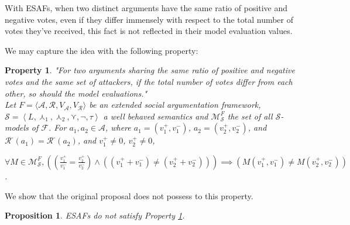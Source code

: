 \documentclass{article}
\newtheorem{property}{Property}
\newtheorem{proposition}{Proposition}
\newcommand{\args}{\mathcal{A}} %
\newcommand{\att}{\mathcal{R}}  %
\newcommand{\valueset}{L}
\newcommand{\varg}{V_{\args}}   %
\newcommand{\vatt}{V_{\att}}   %
\newcommand{\attackers}[1]{\att^\text{-}\left(#1\right)}
\newcommand{\safid}{F}               %
\newcommand{\saf}{\safid = \safbody} %
\newcommand{\safbody}{\langle \args, \att, \varg, \vatt \rangle} %
\newcommand{\semid}{\mathcal{S}}        %
\newcommand{\sembody}{\left\langle \valueset,\SAFand_1, \SAFand_2,\SAFor,\lnot,\tau \right\rangle}
\newcommand{\semdef}{\semid = \sembody}     %
\newcommand{\SAFand}{\curlywedge}     %
\newcommand{\SAFor}{\curlyvee}        %
\begin{document}
With ESAFs, when two distinct arguments have the same ratio of positive and negative votes, even if they differ immensely with respect to the total number of votes they've received, this fact is not reflected in their model evaluation values. 

We may capture the idea with the following property:

\begin{property}
\label{pro:dim}
"For two arguments sharing the same ratio of positive and negative votes and the same set of attackers, if the total number of votes differ from each other, so should the model evaluations."\\
Let $\saf$ be an extended social argumentation framework, $\semdef$ a well behaved semantics and $\mathcal{\mathcal{M}}^F_{\mathcal{S}}$ the set of all $\mathcal{S}$-models of $\mathcal{F}$.  For $a_1, a_2 \in \args$, where $a_1 = (v^+_1, v^-_1)$,  $a_2 = (v^+_2, v^-_2)$, and  $\attackers {a_1} = \attackers {a_2}$, and $v^+_1 \neq 0$, $v^+_2 \neq 0$,
\begin{center}
$\forall M \in \mathcal{\mathcal{M}}^F_{\mathcal{S}},  \left( \left( \frac{v^+_1} {v^-_1} = \frac{v^+_2} {v^-_2} \right) \land  \left(( v^+_1 + v^-_1) \neq ( v^+_2 + v^-_2) \right) \right) \implies \left( M(v^+_1, v^-_1) \neq M(v^+_2, v^-_2) \right)$.
\end{center}

\end{property}

We show that the original proposal does not possess to this property.

\begin{proposition}
ESAFs do not satisfy Property \ref{pro:dim}.
\end{proposition}
\end{document}
